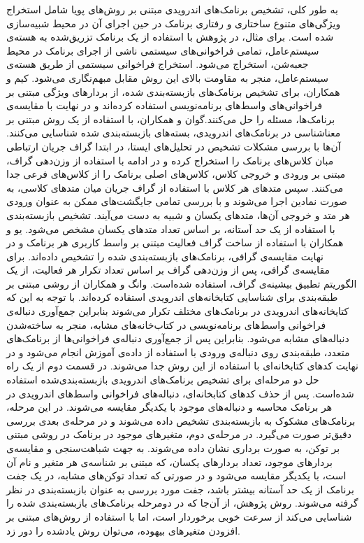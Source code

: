 به طور کلی، تشخیص برنامک‌های اندرویدی مبتنی بر روش‌های پویا شامل استخراج ویژگی‌های متنوع ساختاری و رفتاری برنامک در حین اجرای آن در محیط‌ شبیه‌سازی شده ‌است. برای مثال، در پژوهش  با استفاده از یک برنامک تزریق‌شده به هسته‌‌ی سیستم‌عامل، تمامی فراخوانی‌های سیستمی ناشی از اجرای برنامک در محیط جعبه‌شن، استخراج می‌شود. استخراج فراخوانی سیستمی از طریق هسته‌ی سیستم‌عامل، منجر به مقاومت بالای این روش مقابل مبهم‌نگاری می‌شود. کیم‌ و همکاران، برای تشخیص برنامک‌های بازبسته‌بندی شده، از بردار‌های ویژگی مبتنی بر فراخوانی‌های واسط‌های برنامه‌نویسی‌ استفاده کرده‌اند و در نهایت با مقایسه‌ی برنامک‌ها، مسئله‌ را حل می‌کنند.گوان و همکاران، با استفاده از یک روش مبتنی بر معناشناسی‌ در برنامک‌های اندرویدی، بسته‌های بازبسته‌بندی شده شناسایی می‌کنند. آن‌ها با بررسی مشکلات تشخیص در تحلیل‌های ایستا، در ابتدا گراف جریان ارتباطی مبان کلاس‌های برنامک‌ را استخراج کرده و در ادامه با استفاده از وزن‌دهی گراف، مبتنی بر ورودی و خروجی کلاس، کلاس‌های اصلی برنامک را از کلاس‌های فرعی  جدا می‌کنند. سپس متد‌های هر کلاس با استفاده از گراف جریان میان متد‌های کلاسی، به صورت نمادین اجرا می‌شوند و با بررسی تمامی جایگشت‌های ممکن به عنوان ورودی هر متد و خروجی آن‌ها، متد‌های یکسان و شبیه به دست می‌آیند. تشخیص بازبسته‌بندی با استفاده از یک حد آستانه، بر اساس تعداد متد‌های یکسان مشخص می‌شود. یو و همکاران با استفاده از ساخت گراف فعالیت مبتنی بر واسط کاربری هر برنامک و در نهایت مقایسه‌ی گرافی، برنامک‌های بازبسته‌بندی شده را تشخیص داده‌اند. برای مقایسه‌ی گرافی، پس از وزن‌دهی گراف بر اساس تعداد تکرار هر فعالیت، از یک الگوریتم تطبیق بیشینه‌ی گراف، استفاده شده‌است.
وانگ و همکاران از روشی مبتنی بر طبقه‌بندی برای شناسایی کتابخانه‌های اندرویدی استفاده کرده‌اند. با توجه به این که کتایخانه‌های اندرویدی در برنامک‌های مختلف تکرار می‌شوند بنابراین جمع‌آوری دنباله‌ی فراخوانی‌ واسط‌های برنامه‌نویسی در کتاب‌خانه‌های مشابه، منجر به ساخته‌شدن دنباله‌های مشابه می‌شود. بنابراین پس از جمع‌آوری دنباله‌ی فراخوانی‌ها از برنامک‌های متعدد، طبقه‌بندی روی دنباله‌ی ورودی با استفاده از داده‌ی آموزش انجام می‌شود و در نهایت کد‌های کتابخانه‌ای با استفاده از این روش جدا می‌شوند. در قسمت دوم از یک راه حل دو مرحله‌ای برای تشخیص برنامک‌های اندرویدی بازبسته‌بندی‌شده استفاده شده‌است. پس از حذف کد‌های کتابخانه‌ای، دنباله‌های فراخوانی واسط‌های اندرویدی در هر برنامک محاسبه و دنباله‌های موجود با یکدیگر مقایسه می‌شوند. در این مرحله، برنامک‌های مشکوک به بازبسته‌بندی تشخیص داده می‌شوند و در مرحله‌ی بعدی بررسی دقیق‌تر صورت می‌گیرد. در مرحله‌ی دوم، متغیر‌های موجود در برنامک در روشی مبتنی بر توکن‌، به صورت برداری نشان داده می‌شوند. به جهت شباهت‌سنجی و مقایسه‌ی بردار‌های موجود، تعداد بردار‌های یکسان، که مبتنی بر شناسه‌ی هر متغیر و نام آن است، با یکدیگر مقایسه می‌شود و در صورتی که تعداد توکن‌های مشابه، در یک جفت برنامک از یک حد آستانه بیشتر باشد، جفت مورد بررسی به عنوان بازبسته‌بندی در نظر گرفته می‌شوند. روش پژوهش، از آن‌جا که در دومرحله برنامک‌های بازبسته‌بندی شده را شناسایی می‌کند از سرعت خوبی برخوردار است، اما با استفاده از روش‌های مبتنی بر افزودن متغیر‌های بیهوده، می‌توان روش یاد‌شده را دور زد.\\
